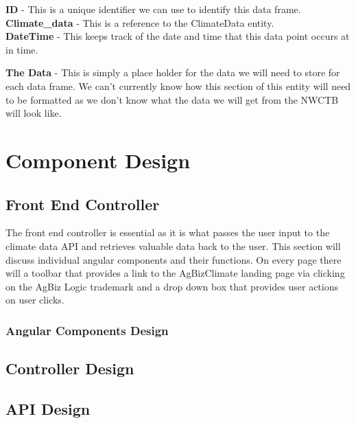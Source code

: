 \documentclass[onecolumn, draftclsnofoot,10pt, compsoc]{article}
\begin{document}
					\textbf{ID} - This is a unique identifier we can use to identify this data frame.\\
					
					\textbf{Climate\_data} - This is a reference to the ClimateData entity.\\
					
					\textbf{DateTime} - This keeps track of the date and time that this data point occurs at in time.
					
					\textbf{The Data} - This is simply a place holder for the data we will need to store for each data frame. We can't currently know how this section of this entity will need to be formatted as we don't know what the data we will get from the NWCTB will look like.\\
				
				
		
		
		
\section{Component Design}

	\subsection{Front End Controller}
		The front end controller is essential as it is what passes the user input to the climate data API and retrieves valuable data back to the user. This section will discuss individual angular components and their functions. On every page there will a toolbar that provides a link to the AgBizClimate landing page via clicking on the AgBiz Logic trademark and a drop down box that provides user actions on user clicks.	
		\subsubsection{Angular Components Design}
			

	\subsection{Controller Design}
	
	\subsection{API Design}
\end{document}
